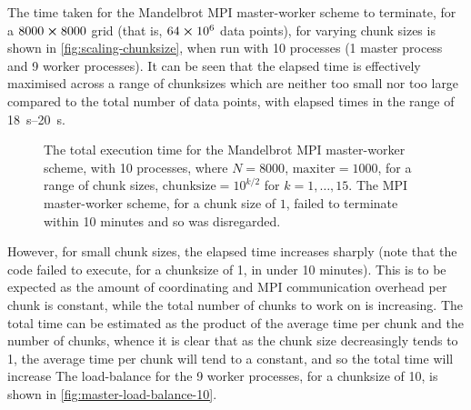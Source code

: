 \documentclass{article}
\begin{document}
The time taken for the Mandelbrot MPI master-worker scheme to terminate, for a
$8000 \cross 8000$ grid (that is, $64 \cross 10^{6}$ data points), for varying
chunk sizes is shown in \autoref{fig:scaling-chunksize}, when run with 10
processes (1 master process and 9 worker processes).
It can be seen that the elapsed time is effectively maximised across a range of
chunksizes which are neither too small nor too large compared to the total
number of data points, with elapsed times in the range of
\SIrange{18}{20}{\second}.

\begin{figure}[h]
  \centering
  \caption{The total execution time for the Mandelbrot MPI master-worker scheme,
  with 10 processes, where $N=8000$, $\mathrm{maxiter}=1000$, for a range of
  chunk sizes, $\mathrm{chunksize} = 10^{k/2}$ for $k = 1, \dotsc, 15$. The MPI
  master-worker scheme, for a chunk size of $1$, failed to terminate within
  10 minutes and so was disregarded.}
  \label{fig:scaling-chunksize}
\end{figure}

However, for small chunk sizes, the elapsed time increases sharply (note that
the code failed to execute, for a chunksize of 1, in under 10 minutes).
This is to be expected as the amount of coordinating and MPI communication
overhead per chunk is constant, while the total number of chunks to work on is
increasing.
The total time can be estimated as the product of the average time per chunk and
the number of chunks, whence it is clear that as the chunk size decreasingly
tends to 1, the average time per chunk will tend to a constant, and so the total
time will increase
The load-balance for the 9 worker processes, for a chunksize of 10, is shown in
\autoref{fig:master-load-balance-10}.
\end{document}

